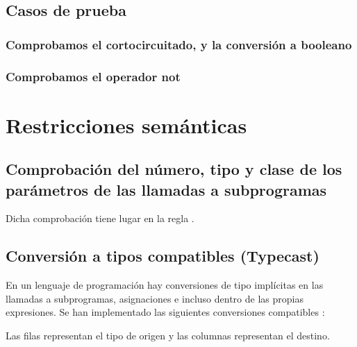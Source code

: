 	\subsection{Casos de prueba}
	
		\subsubsection*{Comprobamos el cortocircuitado, y la conversión a booleano}
		
		
		

		\clearpage
		
		\subsubsection*{Comprobamos el operador not}		
		
		
		
	
\clearpage


\section{Restricciones semánticas}

	\subsection{Comprobación del número, tipo y clase de los parámetros de las llamadas a subprogramas}
	
		Dicha comprobación tiene lugar en la regla .
		
	\subsection{Conversión a tipos compatibles (Typecast)}
	
		En un lenguaje de programación hay conversiones de tipo implícitas en las llamadas a subprogramas, asignaciones e incluso dentro de las propias expresiones. Se han implementado las siguientes conversiones compatibles :
		
		Las filas representan el tipo de origen y las columnas representan el destino.
		
